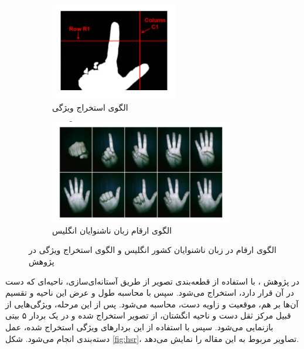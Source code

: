 \documentclass[11.5pt,a4paper]{article}
\begin{document}
\begin{figure}[h]
\center
	\begin{subfigure}{.3\textwidth}
		\includegraphics[scale=0.6]{Imgs/BSLCLAS.png}
		\caption{الگوی استخراج ویژگی}
	\end{subfigure}
	\begin{subfigure}{.4\textwidth}
		\includegraphics[scale=0.7]{Imgs/BSL.png}
		\caption{ الگوی ارقام زبان ناشنوایان انگلیس}
	\end{subfigure}
	
	\caption{الگوی ارقام در زبان ناشنوایان کشور انگلیس و الگوی استخراج ویژگی در پژوهش \cite{rupanagudi2015high}}

\label{fig:bsl1}
\end{figure}

در پژوهش \cite{panwar2012hand}، با استفاده از قطعه‌بندی تصویر از طریق آستانه‌ای‌سازی، ناحیه‌ای که دست در آن قرار دارد، استخراج می‌شود. سپس با محاسبه طول و عرض این ناحیه و تقسیم آن‌ها بر هم، موقعیت و زاویه دست، محاسبه می‌شود. پس از این مرحله، ویژگی‌هایی از قبیل مرکز ثقل دست و ناحیه انگشتان، از تصویر استخراج شده و در یک بردار ۵ بیتی بازنمایی می‌شود. سپس با استفاده از این بردارهای ویژگی استخراج شده، عمل دسته‌بندی انجام می‌شود. شکل \ref{fig:hsr}، تصاویر مربوط به این مقاله را نمایش می‌دهد.
\end{document}
